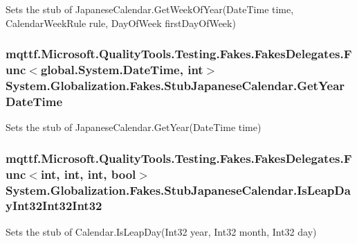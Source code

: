 Sets the stub of Japanese\-Calendar.\-Get\-Week\-Of\-Year(\-Date\-Time time, Calendar\-Week\-Rule rule, Day\-Of\-Week first\-Day\-Of\-Week)

\hypertarget{class_system_1_1_globalization_1_1_fakes_1_1_stub_japanese_calendar_a456806fcd5e0d934b79d5e83b7d19deb}{
\subsubsection[{Get\-Year\-Date\-Time}]{\setlength{\rightskip}{0pt plus 5cm}mqttf.\-Microsoft.\-Quality\-Tools.\-Testing.\-Fakes.\-Fakes\-Delegates.\-Func$<$global.\-System.\-Date\-Time, int$>$ System.\-Globalization.\-Fakes.\-Stub\-Japanese\-Calendar.\-Get\-Year\-Date\-Time}}\label{class_system_1_1_globalization_1_1_fakes_1_1_stub_japanese_calendar_a456806fcd5e0d934b79d5e83b7d19deb}


Sets the stub of Japanese\-Calendar.\-Get\-Year(\-Date\-Time time)

\hypertarget{class_system_1_1_globalization_1_1_fakes_1_1_stub_japanese_calendar_abdd5e9494a52dd9976411e0ba3555c73}{
\subsubsection[{Is\-Leap\-Day\-Int32\-Int32\-Int32}]{\setlength{\rightskip}{0pt plus 5cm}mqttf.\-Microsoft.\-Quality\-Tools.\-Testing.\-Fakes.\-Fakes\-Delegates.\-Func$<$int, int, int, bool$>$ System.\-Globalization.\-Fakes.\-Stub\-Japanese\-Calendar.\-Is\-Leap\-Day\-Int32\-Int32\-Int32}}\label{class_system_1_1_globalization_1_1_fakes_1_1_stub_japanese_calendar_abdd5e9494a52dd9976411e0ba3555c73}


Sets the stub of Calendar.\-Is\-Leap\-Day(\-Int32 year, Int32 month, Int32 day)

